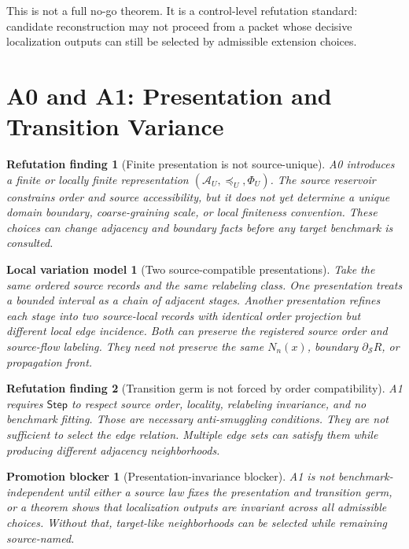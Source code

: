 \documentclass[11pt]{article}
\newcommand{\Sub}{\mathcal{A}}
\newcommand{\Step}{\mathsf{Step}}
\newtheorem{finding}{Refutation finding}
\newtheorem{countermodel}{Local variation model}
\newtheorem{blocker}{Promotion blocker}
\begin{document}
This is not a full no-go theorem. It is a control-level refutation standard:
candidate reconstruction may not proceed from a packet whose decisive
localization outputs can still be selected by admissible extension choices.

\section{A0 and A1: Presentation and Transition Variance}

\begin{finding}[Finite presentation is not source-unique]
A0 introduces a finite or locally finite representation
\((\Sub_U,\preceq_U,\Phi_U)\). The source reservoir constrains order and
source accessibility, but it does not yet determine a unique domain boundary,
coarse-graining scale, or local finiteness convention. These choices can
change adjacency and boundary facts before any target benchmark is consulted.
\end{finding}

\begin{countermodel}[Two source-compatible presentations]
Take the same ordered source records and the same relabeling class. One
presentation treats a bounded interval as a chain of adjacent stages. Another
presentation refines each stage into two source-local records with identical
order projection but different local edge incidence. Both can preserve the
registered source order and source-flow labeling. They need not preserve the
same \(N_n(x)\), boundary \(\partial_{\mathcal{S}}R\), or propagation front.
\end{countermodel}

\begin{finding}[Transition germ is not forced by order compatibility]
A1 requires \(\Step\) to respect source order, locality, relabeling
invariance, and no benchmark fitting. Those are necessary anti-smuggling
conditions. They are not sufficient to select the edge relation. Multiple
edge sets can satisfy them while producing different adjacency neighborhoods.
\end{finding}

\begin{blocker}[Presentation-invariance blocker]
A1 is not benchmark-independent until either a source law fixes the
presentation and transition germ, or a theorem shows that localization outputs
are invariant across all admissible choices. Without that, target-like
neighborhoods can be selected while remaining source-named.
\end{blocker}
\end{document}
